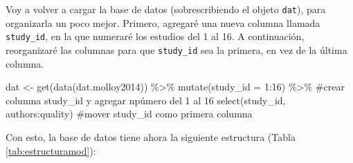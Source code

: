 \documentclass[
  bookmarksnumbered]{article}
\newenvironment{Shaded}{\begin{snugshade}}{\end{snugshade}}
\newcommand{\AttributeTok}[1]{\textcolor[rgb]{0.00,0.34,0.68}{#1}}
\newcommand{\CommentTok}[1]{\textcolor[rgb]{0.54,0.53,0.53}{#1}}
\newcommand{\DecValTok}[1]{\textcolor[rgb]{0.69,0.50,0.00}{#1}}
\newcommand{\FunctionTok}[1]{\textcolor[rgb]{0.39,0.29,0.61}{#1}}
\newcommand{\NormalTok}[1]{\textcolor[rgb]{0.12,0.11,0.11}{#1}}
\newcommand{\OtherTok}[1]{\textcolor[rgb]{0.00,0.43,0.16}{#1}}
\newcommand{\SpecialCharTok}[1]{\textcolor[rgb]{0.24,0.68,0.91}{#1}}
\begin{document}
Voy a volver a cargar la base de datos (sobrescribiendo el objeto \texttt{dat}), para organizarla un poco mejor. Primero, agregaré una nueva columna llamada \texttt{study\_id}, en la que numeraré los estudios del 1 al 16. A continuación, reorganizaré las columnas para que \texttt{study\_id} sea la primera, en vez de la última columna.

\begin{Shaded}
\begin{Highlighting}[]
\NormalTok{dat }\OtherTok{\textless{}{-}} \FunctionTok{get}\NormalTok{(}\FunctionTok{data}\NormalTok{(dat.molloy2014)) }\SpecialCharTok{\%\textgreater{}\%}
  \FunctionTok{mutate}\NormalTok{(}\AttributeTok{study\_id =} \DecValTok{1}\SpecialCharTok{:}\DecValTok{16}\NormalTok{)  }\SpecialCharTok{\%\textgreater{}\%} \CommentTok{\#crear columna study\_id y agregar npúmero del 1 al 16}
  \FunctionTok{select}\NormalTok{(study\_id, authors}\SpecialCharTok{:}\NormalTok{quality) }\CommentTok{\#mover study\_id como primera columna}
\end{Highlighting}
\end{Shaded}

Con esto, la base de datos tiene ahora la siguiente estructura (Tabla \ref{tab:estructuramod}):
\end{document}
